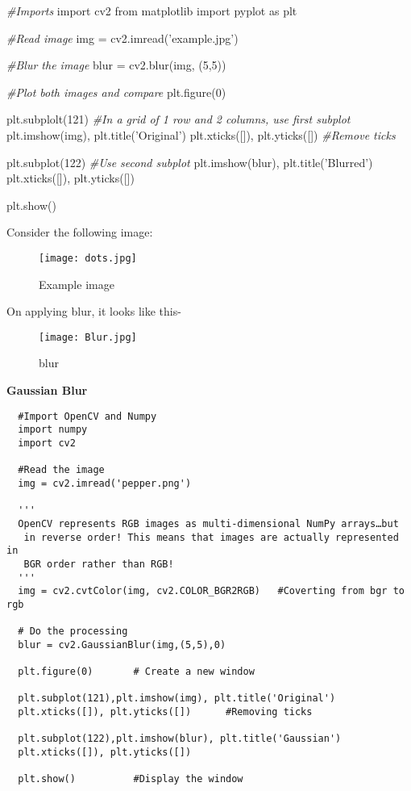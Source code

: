 \documentclass[]{article}
\newenvironment{Shaded}{}{}
\newcommand{\DecValTok}[1]{\textcolor[rgb]{0.25,0.63,0.44}{{#1}}}
\newcommand{\StringTok}[1]{\textcolor[rgb]{0.25,0.44,0.63}{{#1}}}
\newcommand{\ImportTok}[1]{{#1}}
\newcommand{\CommentTok}[1]{\textcolor[rgb]{0.38,0.63,0.69}{\textit{{#1}}}}
\newcommand{\OperatorTok}[1]{\textcolor[rgb]{0.40,0.40,0.40}{{#1}}}
\newcommand{\NormalTok}[1]{{#1}}
\begin{document}
\begin{Shaded}
\begin{Highlighting}[]
    \CommentTok{#Imports}
    \ImportTok{import} \NormalTok{cv2}
    \ImportTok{from} \NormalTok{matplotlib }\ImportTok{import} \NormalTok{pyplot }\ImportTok{as} \NormalTok{plt}
    
    \CommentTok{#Read image}
    \NormalTok{img }\OperatorTok{=} \NormalTok{cv2.imread(}\StringTok{'example.jpg'}\NormalTok{)}

    \CommentTok{#Blur the image}
    \NormalTok{blur }\OperatorTok{=} \NormalTok{cv2.blur(img, (}\DecValTok{5}\NormalTok{,}\DecValTok{5}\NormalTok{))}

    \CommentTok{#Plot both images and compare}
    \NormalTok{plt.figure(}\DecValTok{0}\NormalTok{)}
    
    \NormalTok{plt.subplolt(}\DecValTok{121}\NormalTok{) }\CommentTok{#In a grid of 1 row and 2 columns, use first subplot}
    \NormalTok{plt.imshow(img), plt.title(}\StringTok{'Original'}\NormalTok{)}
    \NormalTok{plt.xticks([]), plt.yticks([]) }\CommentTok{#Remove ticks}

    \NormalTok{plt.subplot(}\DecValTok{122}\NormalTok{) }\CommentTok{#Use second subplot}
    \NormalTok{plt.imshow(blur), plt.title(}\StringTok{'Blurred'}\NormalTok{)}
    \NormalTok{plt.xticks([]), plt.yticks([])}

    \NormalTok{plt.show()}
\end{Highlighting}
\end{Shaded}

Consider the following image:

\begin{figure}[htbp]
\centering
\texttt{[image: dots.jpg]}
\caption{Example image}
\end{figure}

On applying blur, it looks like this-

\begin{figure}
\texttt{[image: Blur.jpg]}
\caption{blur} 
\end{figure}

\textbf{\LARGE Gaussian Blur}

\begin{verbatim}
  #Import OpenCV and Numpy
  import numpy
  import cv2

  #Read the image
  img = cv2.imread('pepper.png')

  '''
  OpenCV represents RGB images as multi-dimensional NumPy arrays…but
   in reverse order! This means that images are actually represented in 
   BGR order rather than RGB!
  '''
  img = cv2.cvtColor(img, cv2.COLOR_BGR2RGB)   #Coverting from bgr to rgb

  # Do the processing
  blur = cv2.GaussianBlur(img,(5,5),0)

  plt.figure(0)       # Create a new window

  plt.subplot(121),plt.imshow(img), plt.title('Original')
  plt.xticks([]), plt.yticks([])      #Removing ticks

  plt.subplot(122),plt.imshow(blur), plt.title('Gaussian')
  plt.xticks([]), plt.yticks([])

  plt.show()          #Display the window
\end{verbatim}
\end{document}
